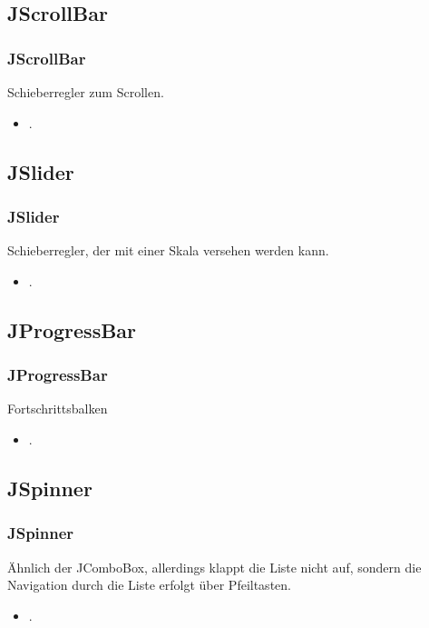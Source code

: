 \documentclass[xcolor=dvipsnames]{beamer}
\begin{document}
\subsection{JScrollBar}
\begin{frame} %
  \frametitle{JScrollBar
} %
  \begin{block}{Schieberregler zum Scrollen.}
	  \begin{itemize}
		\item .
	  \end{itemize}
  \end{block}
\end{frame}

\subsection{JSlider}
\begin{frame} %
  \frametitle{JSlider
} %
  \begin{block}{Schieberregler, der mit einer Skala versehen werden kann.}
	  \begin{itemize}
		\item .
	  \end{itemize}
  \end{block}
\end{frame}

\subsection{JProgressBar}
\begin{frame} %
  \frametitle{JProgressBar} %
  \begin{block}{Fortschrittsbalken}
	  \begin{itemize}
		\item .
	  \end{itemize}
  \end{block}
\end{frame}

\subsection{JSpinner}
\begin{frame} %
  \frametitle{JSpinner
} %
  \begin{block}{Ähnlich der JComboBox, allerdings klappt die Liste nicht auf, sondern die Navigation durch die Liste erfolgt über Pfeiltasten.}
	  \begin{itemize}
		\item .
	  \end{itemize}
  \end{block}
\end{frame}
\end{document}
